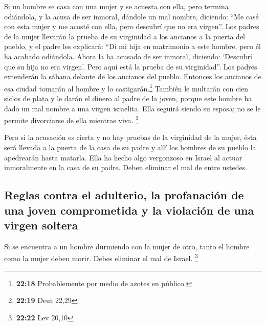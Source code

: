  Si un hombre se casa con una mujer y se acuesta con
ella, pero termina odiándola,  y la acusa de ser inmoral,
dándole un mal nombre, diciendo: ``Me casé con esta mujer y me acosté
con ella, pero descubrí que no era virgen''.  Los padres
de la mujer llevarán la prueba de su virginidad a los ancianos a la
puerta del pueblo,  y el padre les explicará: ``Di mi
hija en matrimonio a este hombre, pero él ha acabado odiándola.
 Ahora la ha acusado de ser inmoral, diciendo: `Descubrí
que su hija no era virgen'. Pero aquí está la prueba de su virginidad''.
Los padres extenderán la sábana delante de los ancianos del pueblo.
 Entonces los ancianos de esa ciudad tomarán al hombre y
lo castigarán.\footnote{\textbf{22:18} Probablemente por medio de azotes
  en público.}  También le multarán con cien siclos de
plata y le darán el dinero al padre de la joven, porque este hombre ha
dado un mal nombre a una virgen israelita. Ella seguirá siendo su
esposa; no se le permite divorciarse de ella mientras viva. \footnote{\textbf{22:19}
  Deut 22,29}

 Pero si la acusación es cierta y no hay pruebas de la
virginidad de la mujer,  ésta será llevada a la puerta de
la casa de su padre y allí los hombres de su pueblo la apedrearán hasta
matarla. Ella ha hecho algo vergonzoso en Israel al actuar inmoralmente
en la casa de su padre. Deben eliminar el mal de entre ustedes.

\hypertarget{reglas-contra-el-adulterio-la-profanaciuxf3n-de-una-joven-comprometida-y-la-violaciuxf3n-de-una-virgen-soltera}{%
\subsection{Reglas contra el adulterio, la profanación de una joven
comprometida y la violación de una virgen
soltera}\label{reglas-contra-el-adulterio-la-profanaciuxf3n-de-una-joven-comprometida-y-la-violaciuxf3n-de-una-virgen-soltera}}

 Si se encuentra a un hombre durmiendo con la mujer de
otro, tanto el hombre como la mujer deben morir. Debes eliminar el mal
de Israel. \footnote{\textbf{22:22} Lev 20,10}

